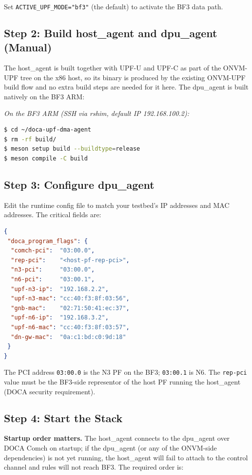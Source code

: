 \documentclass[conference]{IEEEtran}
\newcommand{\code}[1]{\nolinkurl{#1}}
\newcommand{\runlabel}[1]{\medskip\noindent\textit{#1}\par}
\begin{document}
Set \code{ACTIVE_UPF_MODE="bf3"} (the default) to activate the BF3
data path.

\subsection{Step 2: Build host\_agent and dpu\_agent (Manual)}

The host\_agent is built together with UPF-U and UPF-C as part of the
ONVM-UPF tree on the x86 host, so its binary is produced by the
existing ONVM-UPF build flow and no extra build steps are needed for it
here.  The dpu\_agent is built natively on the BF3 ARM:

\runlabel{On the BF3 ARM (SSH via rshim, default IP 192.168.100.2):}
\begin{lstlisting}[language=bash]
$ cd ~/doca-upf-dma-agent
$ rm -rf build/
$ meson setup build --buildtype=release
$ meson compile -C build
\end{lstlisting}

\subsection{Step 3: Configure dpu\_agent}

Edit the runtime config file
to match your testbed's IP addresses and MAC addresses.  The critical
fields are:

\begin{lstlisting}[language=json]
{
 "doca_program_flags": {
  "comch-pci":  "03:00.0",
  "rep-pci":    "<host-pf-rep-pci>",
  "n3-pci":     "03:00.0",
  "n6-pci":     "03:00.1",
  "upf-n3-ip":  "192.168.2.2",
  "upf-n3-mac": "cc:40:f3:8f:03:56",
  "gnb-mac":    "02:71:50:41:ec:37",
  "upf-n6-ip":  "192.168.3.2",
  "upf-n6-mac": "cc:40:f3:8f:03:57",
  "dn-gw-mac":  "0a:c1:bd:c0:9d:18"
 }
}
\end{lstlisting}

The PCI address \texttt{03:00.0} is the N3 PF on the BF3; \texttt{03:00.1}
is N6.  The \code{rep-pci} value must be the BF3-side representor of the
host PF running the host\_agent (DOCA security requirement).

\subsection{Step 4: Start the Stack}

\textbf{Startup order matters.}  The host\_agent connects to the
dpu\_agent over DOCA Comch on startup; if the dpu\_agent (or any of the
ONVM-side dependencies) is not yet running, the host\_agent will fail
to attach to the control channel and rules will not reach BF3.  The
required order is:
\end{document}
